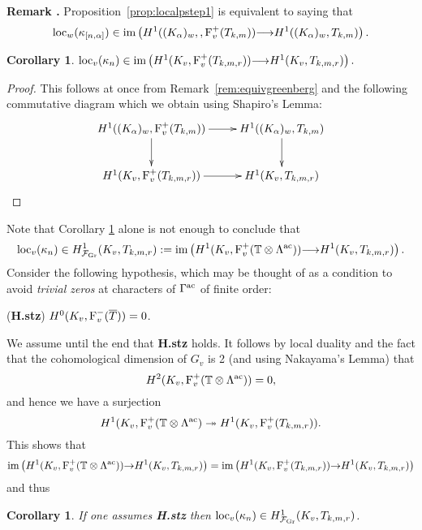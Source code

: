 \documentclass[12pt]{amsart}
\numberwithin{equation}{section}
\newtheorem{cor}[thm]{Corollary}
\newenvironment{rem}{\par\medskip\noindent\refstepcounter{thm}
\bgroup{\hspace*{-0.15 cm}\bf{Remark} \thethm.}\bgroup}{\egroup
\egroup\par\medskip} \parskip 2pt
\begin{document}
\begin{rem}
\label{rem:equivgreenberg}
Proposition~\ref{prop:localpstep1} is equivalent to saying that
$$\textup{loc}_w(\kappa_{[n,\alpha]}) \in \textup{im}\left(H^1((K_\alpha)_w,,\textup{F}_v^+(T_{k,m})){\longrightarrow} H^1((K_\alpha)_w,T_{k,m})\right).$$
\end{rem}
\begin{cor}
\label{cor:localpstep1}
$\textup{loc}_v(\kappa_{n}) \in \textup{im}\left(H^1(K_v,\textup{F}_v^+(T_{k,m,r})){\longrightarrow} H^1(K_v,T_{k,m,r})\right).$
\end{cor}
\begin{proof}
This follows at once from Remark~\ref{rem:equivgreenberg} and the following commutative diagram which we obtain using Shapiro's Lemma:
$$\xymatrix{H^1((K_\alpha)_w,\textup{F}_v^+(T_{k,m}))\ar[d]\ar[r]& H^1((K_\alpha)_w,T_{k,m})\ar[d]\\
H^1(K_v,\textup{F}_v^+(T_{k,m,r}))\ar[r]& H^1(K_v,T_{k,m,r})
}$$
\end{proof}

Note that Corollary \ref{cor:localpstep1} alone is not enough to conclude that
$$\textup{loc}_v(\kappa_{n}) \in H^1_{{\mathcal{F}}_{\textup{Gr}}}(K_v,T_{k,m,r}):=\textup{im}\left(H^1(K_v,\textup{F}_v^+({\mathbb{T}}\otimes{\Lambda}^{\textup{ac}})){\longrightarrow} H^1(K_v,T_{k,m,r}) \right).$$
Consider the following hypothesis, which may be thought of as a condition to avoid \emph{trivial zeros} at characters of $\Gamma^{\textup{ac}}$ of finite order:

(\textbf{H.stz}) $H^0(K_v,\textup{F}_v^-(\overline{T}))=0$.

We assume until the end that \textbf{H.stz} holds. It follows by local duality and the fact that the cohomological dimension of $G_v$ is 2 (and using Nakayama's Lemma) that
$$H^2(K_v,\textup{F}_v^+({\mathbb{T}}\otimes{\Lambda}^{\textup{ac}}))=0,$$ and hence we have a surjection
$$H^1(K_v,\textup{F}_v^+({\mathbb{T}}\otimes{\Lambda}^{\textup{ac}})\twoheadrightarrow H^1(K_v,\textup{F}_v^+(T_{k,m,r})).$$
This shows that
$$\textup{im}\left(H^1(K_v,\textup{F}_v^+({\mathbb{T}}\otimes{\Lambda}^{\textup{ac}})){\rightarrow} H^1(K_v,T_{k,m,r})\right)=\textup{im}\left(H^1(K_v,\textup{F}_v^+(T_{k,m,r})){\rightarrow} H^1(K_v,T_{k,m,r})\right)$$
and thus
\begin{cor}
\label{cor:greenbergatphstz}
If one assumes \textbf{\upshape H.stz} then $\textup{loc}_v(\kappa_{n}) \in H^1_{{\mathcal{F}}_{\textup{Gr}}}(K_v,T_{k,m,r})$.
\end{cor}
\end{document}
